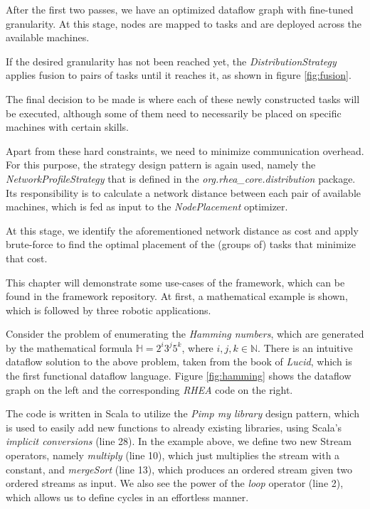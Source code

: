 \documentclass{dithesis}
\begin{document}


After the first two passes, we have an optimized dataflow graph with fine-tuned granularity. At this stage, nodes are mapped to tasks and are deployed across the available machines. 

If the desired granularity has not been reached yet, the \textit{DistributionStrategy} applies fusion to pairs of tasks until it reaches it, as shown in figure \ref{fig:fusion}.


The final decision to be made is where each of these newly constructed tasks will be executed, although some of them need to necessarily be placed on specific machines with certain skills. 

Apart from these hard constraints, we need to minimize communication overhead. For this purpose, the strategy design pattern is again used, namely the \textit{NetworkProfileStrategy} that is defined in the \textit{org.rhea\_core.distribution} package. Its responsibility is to calculate a network distance between each pair of available machines, which is fed as input to the \textit{NodePlacement} optimizer. 

At this stage, we identify the aforementioned network distance as cost and apply brute-force to find the optimal placement of the (groups of) tasks that minimize that cost.

This chapter will demonstrate some use-cases of the framework, which can be found in the framework repository\cite{rhea}. At first, a mathematical example is shown, which is followed by three robotic applications. 

Consider the problem of enumerating the \textit{Hamming numbers}, which are generated by the mathematical formula $\mathbb{H} = 2^i3^j5^k$, where $i,j,k \in \mathbb{N}$. There is an intuitive dataflow solution to the above problem, taken from the book of \textit{Lucid}, which is the first functional dataflow language\cite{lucid}. Figure \ref{fig:hamming} shows the dataflow graph on the left and the corresponding \textit{RHEA} code on the right.


The code is written in Scala to utilize the \textit{Pimp my library} design pattern\cite{pimp}, which is used to easily add new functions to already existing libraries, using Scala's \textit{implicit conversions} (line 28). In the example above, we define two new Stream operators, namely \textit{multiply} (line 10), which just multiplies the stream with a constant, and \textit{mergeSort} (line 13), which produces an ordered stream given two ordered streams as input. We also see the power of the \textit{loop} operator (line 2), which allows us to define cycles in an effortless manner.
\end{document}
